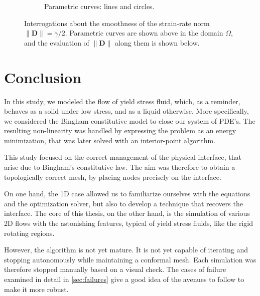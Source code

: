 \documentclass[11 pt]{report}
\begin{document}
\begin{figure}
\begin{subfigure}[t]{0.495\textwidth}
        \caption{Parametric curves: lines and circles.}
    \end{subfigure}
    \begin{subfigure}[t]{\textwidth}
        
    \end{subfigure}
    \begin{subfigure}[t]{\textwidth}
        
    \end{subfigure}
    \caption{Interrogations about the smoothness of the strain-rate norm $\|\mathbf{D}\|=\dot \gamma/2$. Parametric curves are shown above in the domain $\Omega$, and the evaluation of $\|\mathbf{D}\|$ along them is shown below.}
    \label{fig:failureRoot}
\end{figure}

\FloatBarrier
{}
\chapter*{Conclusion}

In this study, we modeled the flow of yield stress fluid, which, as a reminder, behaves as a solid under low stress, and as a liquid otherwise. More specifically, we considered the Bingham constitutive model to close our system of PDE's. The resulting non-linearity was handled by expressing the problem as an energy minimization, that was later solved with an interior-point algorithm.

This study focused on the correct management of the physical interface, that arise due to Bingham's constitutive law. The aim was therefore to obtain a topologically correct mesh, by placing nodes precisely on the interface. 

On one hand, the 1D case allowed us to familiarize ourselves with the equations and the optimization solver, but also to develop a technique that recovers the interface. The core of this thesis, on the other hand, is the simulation of various 2D flows with the astonishing features, typical of yield stress fluids, like the rigid rotating regions. %

However, the algorithm is not yet mature. It is not yet capable of iterating and stopping autonomously while maintaining a conformal mesh. Each simulation was therefore stopped manually based on a visual check. The cases of failure examined in detail in \cref{sec:failures} give a good idea of the avenues to follow to make it more robust. 
\end{document}
